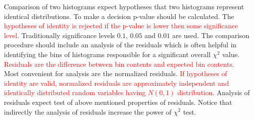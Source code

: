 \documentclass[12pt,a4paper]{article}
\begin{document}
Comparison of two histograms expect hypotheses that two histograms represent identical distributions. To make a decision p-value should be calculated. The \textcolor{red}{hypotheses of identity is rejected if the p-value is lower then some significance level}. Traditionally significance levels $0.1$, $0.05$ and $0.01$ are used. The comparison procedure should include an analysis of the residuals which is often helpful in identifying the bins of histograms responsible for a significant overall $\chi^2$ value. \textcolor{red}{Residuals are the difference between bin contents and expected bin contents}. Most convenient for analysis are the normalized residuals. \textcolor{red}{If hypotheses of identity are valid, normalized residuals are approximately independent and identically distributed random variables having $N(0,1)$ distribution}. Analysis of residuals expect test of above mentioned properties of residuals. Notice that indirectly the analysis of residuals increase the power of $\chi^2$ test.
\end{document}
